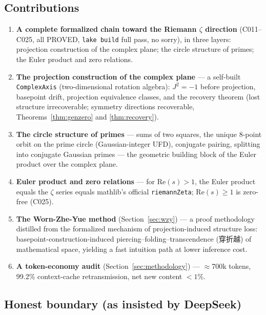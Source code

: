 \documentclass[11pt]{article}
\theoremstyle{remark}
\begin{document}
\subsection{Contributions}
\begin{enumerate}
  \item \textbf{A complete formalized chain toward the Riemann $\zeta$
        direction} (C011--C025, all PROVED, \texttt{lake build} full pass, no
        sorry), in three layers: projection construction of the complex
        plane; the circle structure of primes; the Euler product and zero
        relations.
  \item \textbf{The projection construction of the complex plane} --- a
        self-built \texttt{ComplexAxis} (two-dimensional rotation algebra):
        $J^2=-1$ before projection, basepoint drift, projection equivalence
        classes, and the recovery theorem (lost structure irrecoverable;
        symmetry directions recoverable, Theorems~\ref{thm:genzero} and
        \ref{thm:recovery}).
  \item \textbf{The circle structure of primes} --- sums of two squares, the
        unique 8-point orbit on the prime circle (Gaussian-integer UFD),
        conjugate pairing, splitting into conjugate Gaussian primes --- the
        geometric building block of the Euler product over the complex plane.
  \item \textbf{Euler product and zero relations} --- for
        $\mathrm{Re}(s)>1$, the Euler product equals the $\zeta$ series
        equals mathlib's official \texttt{riemannZeta}; $\mathrm{Re}(s)\geq 1$
        is zero-free (C025).
  \item \textbf{The Worn-Zhe-Yue method} (Section~\ref{sec:wzy}) --- a proof
        methodology distilled from the formalized mechanism of
        projection-induced structure loss: basepoint-construction-induced
        piercing--folding--transcendence (穿折越) of mathematical space,
        yielding a fast intuition path at lower inference cost.
  \item \textbf{A token-economy audit} (Section~\ref{sec:methodology}) ---
        $\approx$700k tokens, 99.2\% context-cache retransmission, net new
        content $<1\%$.
\end{enumerate}

\subsection{Honest boundary (as insisted by DeepSeek)}
\label{sec:attribution}
\end{document}
